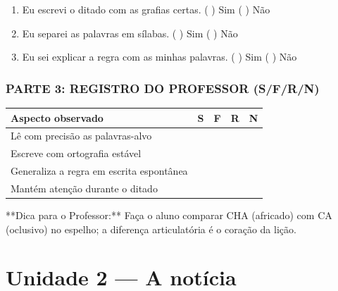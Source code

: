 \begin{exercicio}
\begin{enumerate}[label=\alph*)]
  \item Eu escrevi o ditado com as grafias certas.  \quad ( ) Sim   ( ) Não

  \item Eu separei as palavras em sílabas.  \quad ( ) Sim   ( ) Não

  \item Eu sei explicar a regra com as minhas palavras.  \quad ( ) Sim   ( ) Não

\end{enumerate}

\subsection*{PARTE 3: REGISTRO DO PROFESSOR (S/F/R/N)}

\begin{center}
\renewcommand{\arraystretch}{1.4}
\begin{tabular}{@{}p{9cm}cccc@{}}
\toprule
Aspecto observado & S & F & R & N \\
\midrule
Lê com precisão as palavras-alvo & & & & \\
Escreve com ortografia estável & & & & \\
Generaliza a regra em escrita espontânea & & & & \\
Mantém atenção durante o ditado & & & & \\
\bottomrule\end{tabular}\end{center}

\end{exercicio}

\begin{dica}
**Dica para o Professor:** Faça o aluno comparar CHA (africado) com CA (oclusivo) no espelho; a diferença articulatória é o coração da lição.
\end{dica}



\chapter{Unidade 2 --- A notícia}


